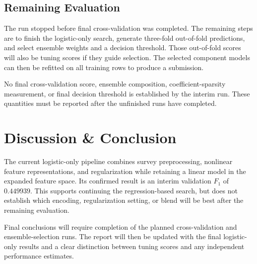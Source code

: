 \documentclass[10pt,conference,compsocconf]{IEEEtran}
\begin{document}
\subsection{Remaining Evaluation}

The run stopped before final cross-validation was completed. The remaining
steps are to finish the logistic-only search, generate three-fold out-of-fold
predictions, and select ensemble weights and a decision threshold. Those
out-of-fold scores will also be tuning scores if they guide selection.
The selected component models can then be refitted on all training rows to
produce a submission.

No final cross-validation score, ensemble composition, coefficient-sparsity
measurement, or final decision threshold is established by the interim run.
These quantities must be reported after the unfinished runs have completed.

\section{Discussion \& Conclusion}

The current logistic-only pipeline combines survey preprocessing, nonlinear
feature representations, and regularization while retaining a linear model in
the expanded feature space. Its confirmed result is an interim validation
$F_1$ of $0.449939$. This supports continuing the regression-based search, but
does not establish which encoding, regularization setting, or blend will be
best after the remaining evaluation.

Final conclusions will require completion of the planned cross-validation
and ensemble-selection runs. The report will then be updated with the final
logistic-only results and a clear distinction between tuning scores and any
independent performance estimates.

\balance



\end{document}
